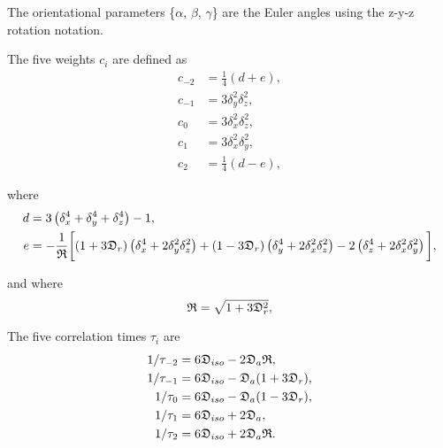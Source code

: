 \noindent The orientational parameters \{$\alpha$, $\beta$, $\gamma$\} are the Euler angles using the z-y-z rotation notation.


The five weights $c_i$ are defined as
\begin{subequations}
\begin{align}
 c_{-2} &= \tfrac{1}{4}(d + e),     \label{eq: ellipsoid c-2} \\
 c_{-1} &= 3\delta_y^2\delta_z^2,   \label{eq: ellipsoid c-1} \\
 c_{0}  &= 3\delta_x^2\delta_z^2,   \label{eq: ellipsoid c0} \\
 c_{1}  &= 3\delta_x^2\delta_y^2,   \label{eq: ellipsoid c1} \\
 c_{2}  &= \tfrac{1}{4}(d - e),     \label{eq: ellipsoid c2}
\end{align}
\end{subequations}

\noindent where
\begin{align}
 d &= 3 \left( \delta_x^4 + \delta_y^4 + \delta_z^4 \right) - 1, \label{eq: ellipsoid d} \\
 e &= -\frac{1}{\mathfrak{R}} \bigg[ (1 + 3\mathfrak{D}_r) \left(\delta_x^4 + 2\delta_y^2\delta_z^2\right)
   + (1 - 3\mathfrak{D}_r) \left(\delta_y^4 + 2\delta_x^2\delta_z^2\right) - 2 \left(\delta_z^4 + 2\delta_x^2\delta_y^2\right) \bigg], \label{eq: ellipsoid e}
\end{align}

\noindent and where
\begin{equation}
 \mathfrak{R} = \sqrt{1 + 3\mathfrak{D}_r^2},
\end{equation}


The five correlation times $\tau_i$ are
\begin{subequations}
\begin{align}
 1/\tau_{-2} &= 6 \mathfrak{D}_{iso} - 2\mathfrak{D}_a\mathfrak{R},   \label{eq: ellipsoid tau-2} \\
 1/\tau_{-1} &= 6 \mathfrak{D}_{iso} - \mathfrak{D}_a (1 + 3\mathfrak{D}_r), \label{eq: ellipsoid tau-1} \\
 1/\tau_{0}  &= 6 \mathfrak{D}_{iso} - \mathfrak{D}_a (1 - 3\mathfrak{D}_r), \label{eq: ellipsoid tau0} \\
 1/\tau_{1}  &= 6 \mathfrak{D}_{iso} + 2\mathfrak{D}_a,               \label{eq: ellipsoid tau1} \\
 1/\tau_{2}  &= 6 \mathfrak{D}_{iso} + 2\mathfrak{D}_a\mathfrak{R}.   \label{eq: ellipsoid tau2}
\end{align}
\end{subequations}


